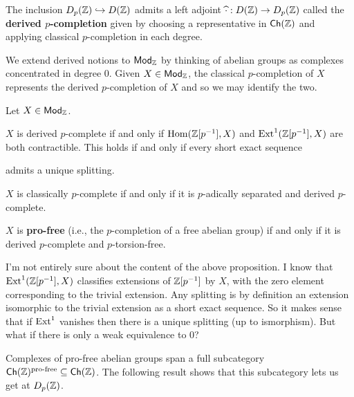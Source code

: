 \documentclass[11pt]{article}
\newcommand{\pf}{\textup{pro-free}} %
\begin{document}
\begin{proposition}
The inclusion $D_p(\mathbb{Z})\hookrightarrow D(\mathbb{Z})$ admits a left adjoint $\widehat{\cdot}: D(\mathbb{Z})\to D_p(\mathbb{Z})$ called the \textbf{derived $p$-completion} given by choosing a representative in $\operatorname{\mathsf{Ch}}(\mathbb{Z})$ and applying classical $p$-completion in each degree.
\end{proposition}

We extend derived notions to $\operatorname{\mathsf{Mod}}_{\mathbb{Z}}$ by thinking of abelian groups as complexes concentrated in degree $0$. Given $X\in\operatorname{\mathsf{Mod}}_{\mathbb{Z}}$, the classical $p$-completion of $X$ represents the derived $p$-completion of $X$ and so we may identify the two.

\begin{proposition}
Let $X\in\operatorname{\mathsf{Mod}}_{\mathbb{Z}}$. 
\begin{enum}{\alph}
\item $X$ is derived $p$-complete if and only if $\operatorname{Hom}(\mathbb{Z}[p^{-1}],X)$ and $\operatorname{Ext}^1(\mathbb{Z}[p^{-1}],X)$ are both contractible. This holds if and only if every short exact sequence
\begin{center}
\end{center}
admits a unique splitting.

\item $X$ is classically $p$-complete if and only if it is $p$-adically separated and derived $p$-complete.

\item $X$ is \textbf{pro-free} (i.e., the $p$-completion of a free abelian group) if and only if it is derived $p$-complete and $p$-torsion-free.
\end{enum}
\end{proposition}

\begin{remark}
I'm not entirely sure about the content of the above proposition. I know that $\operatorname{Ext}^1(\mathbb{Z}[p^{-1}],X)$ classifies extensions of $\mathbb{Z}[p^{-1}]$ by $X$, with the zero element corresponding to the trivial extension. Any splitting is by definition an extension isomorphic to the trivial extension as a short exact sequence. So it makes sense that if $\operatorname{Ext}^1$ vanishes then there is a unique splitting (up to ismorphism). But what if there is only a weak equivalence to $0$?
\end{remark}

Complexes of pro-free abelian groups span a full subcategory $\Ch(\Z)^{\pf}\subset\Ch(\Z)$. The following result shows that this subcategory lets us get at $D_p(\mathbb{Z})$.
\end{document}
